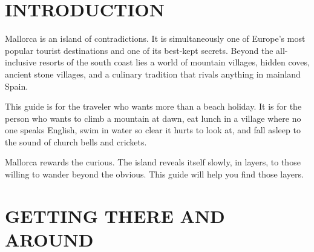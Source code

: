 \documentclass[
    language=english,
    doctype=travel-guide,
    institution=none,
]{../../omnilatex}
\begin{document}
\maketitle

\vspace{1cm}

\begin{center}
\end{center}

\section*{INTRODUCTION}

Mallorca is an island of contradictions. It is simultaneously one of Europe's most popular tourist destinations and one of its best-kept secrets. Beyond the all-inclusive resorts of the south coast lies a world of mountain villages, hidden coves, ancient stone villages, and a culinary tradition that rivals anything in mainland Spain.

This guide is for the traveler who wants more than a beach holiday. It is for the person who wants to climb a mountain at dawn, eat lunch in a village where no one speaks English, swim in water so clear it hurts to look at, and fall asleep to the sound of church bells and crickets.

Mallorca rewards the curious. The island reveals itself slowly, in layers, to those willing to wander beyond the obvious. This guide will help you find those layers.

\section*{GETTING THERE AND AROUND}
\end{document}
